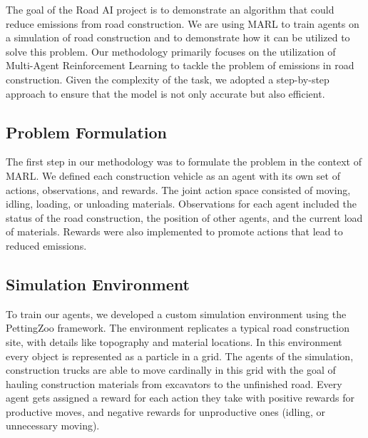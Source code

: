 \documentclass[conference]{IEEEtran}
\begin{document}
The goal of the Road AI project is to demonstrate an algorithm that could reduce emissions from road construction.
We are using MARL to train agents on a simulation of road construction and to demonstrate how it can be utilized to solve this problem.
Our methodology primarily focuses on the utilization of Multi-Agent Reinforcement Learning to tackle the problem of emissions in road construction. Given the complexity of the task, we adopted a step-by-step approach to ensure that the model is not only accurate but also efficient.

\subsection{Problem Formulation}
The first step in our methodology was to formulate the problem in the context of MARL. We defined each construction vehicle as an agent with its own set of actions, observations, and rewards. The joint action space consisted of moving, idling, loading, or unloading materials. Observations for each agent included the status of the road construction, the position of other agents, and the current load of materials. Rewards were also implemented to promote actions that lead to reduced emissions.

\subsection{Simulation Environment}
To train our agents, we developed a custom simulation environment using the PettingZoo framework. The environment replicates a typical road construction site, with details like topography and material locations. In this environment every object is represented as a particle in a grid.
The agents of the simulation, construction trucks are able to move cardinally in this grid with the goal of hauling construction materials from excavators to the unfinished road.
Every agent gets assigned a reward for each action they take with positive rewards for productive moves, and negative rewards for unproductive ones (idling, or unnecessary moving).
\end{document}
